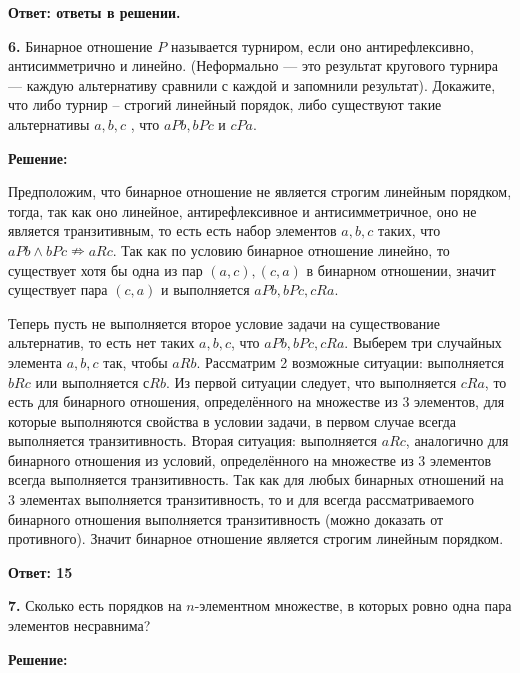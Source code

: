\documentclass[a4paper,12pt]{article} %
\begin{document}
\begin{flushright}
\begin{large}
\textbf {Ответ: ответы в решении.}
\end{large}
\end{flushright}

{\bf 6.} Бинарное отношение $P$ называется турниром, если оно антирефлексивно, антисимметрично и линейно. (Неформально — это результат кругового турнира — каждую альтернативу сравнили с каждой и запомнили результат). Докажите, что либо турнир -- строгий линейный порядок, либо существуют такие альтернативы $a, b, c$ , что $aP b, bP c$ и $cP a.$
\begin{center}
\bfseries
{\Large Решение: }
\end{center}

Предположим, что бинарное отношение не является строгим линейным порядком, тогда, так как оно линейное, антирефлексивное и антисимметричное, оно не является транзитивным, то есть есть набор элементов $a, b, c$ таких, что $aPb \wedge bPc \nRightarrow aRc$. Так как по условию бинарное отношение линейно, то существует хотя бы одна из пар $(a,c), (c,a)$ в бинарном отношении, значит существует пара $(c,a)$ и выполняется $aPb, bPc, cRa$.

Теперь пусть не выполняется второе условие задачи на существование альтернатив, то есть нет таких $a, b, c$, что $aPb, bPc, cRa$. Выберем три случайных элемента $a, b, c$ так, чтобы $aRb$. Рассматрим 2 возможные ситуации: выполняется $bRc$ или выполняется $сRb$. Из первой ситуации следует, что выполняется $cRa$, то есть для бинарного отношения, определённого на множестве из $3$ элементов, для которые выполняются свойства в условии задачи, в первом случае всегда выполняется транзитивность. Вторая ситуация: выполняется $aRc$, аналогично для бинарного отношения из условий, определённого на множестве из $3$ элементов всегда выполняется транзитивность. Так как для любых бинарных отношений на $3$ элементах выполняется транзитивность, то и для всегда рассматриваемого бинарного отношения выполняется транзитивность (можно доказать от противного). Значит бинарное отношение является строгим линейным порядком.

\begin{flushright}
\begin{large}
\textbf {Ответ: 15}
\end{large}
\end{flushright}

{\bf 7.} Сколько есть порядков на $n$-элементном множестве, в которых ровно
одна пара элементов несравнима?
\begin{center}
\bfseries
{\Large Решение: }
\end{center}
\end{document}
